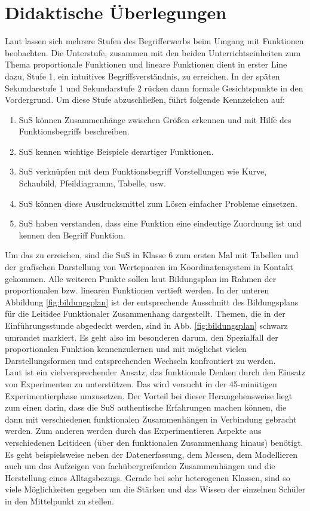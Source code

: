 \documentclass[../main.tex]{subfiles}
\begin{document}
\section{Didaktische Überlegungen}
Laut \cite{Vollrath2007} lassen sich mehrere Stufen des Begrifferwerbs beim Umgang mit Funktionen beobachten. Die Unterstufe, zusammen mit den beiden Unterrichtseinheiten zum Thema proportionale Funktionen und lineare Funktionen dient in erster Line dazu, Stufe 1, ein intuitives Begriffsverständnis, zu erreichen. In der späten Sekundarstufe 1 und Sekundarstufe 2 rücken dann formale Gesichtspunkte in den Vordergrund. Um diese Stufe abzuschließen, führt \cite{Beckmann2009} folgende Kennzeichen auf:
\begin{enumerate}
    \item SuS können Zusammenhänge zwischen Größen erkennen und mit Hilfe des Funktionsbegriffs beschreiben.
    \item SuS kennen wichtige Beispiele derartiger Funktionen.
    \item SuS verknüpfen mit dem Funktionsbegriff Vorstellungen wie Kurve, Schaubild, Pfeildiagramm, Tabelle, usw.
    \item SuS können diese Ausdrucksmittel zum Lösen einfacher Probleme einsetzen.
    \item SuS haben verstanden, dass eine Funktion eine eindeutige Zuordnung ist und kennen den Begriff \glqq Funktion\grqq{}.
\end{enumerate}
Um das zu erreichen, sind die SuS in Klasse 6 zum ersten Mal mit Tabellen und der grafischen Darstellung von Wertepaaren im Koordinatensystem in Kontakt gekommen. Alle weiteren Punkte sollen laut Bildungsplan \cite{Kultus2016} im Rahmen der proportionalen bzw. linearen Funktionen vertieft werden. In der unteren Abbildung \ref{fig:bildungsplan} ist der entsprechende Ausschnitt des Bildungsplans für die Leitidee \glqq Funktionaler Zusammenhang\grqq{} dargestellt. Themen, die in der Einführungsstunde abgedeckt werden, sind in Abb. \ref{fig:bildungsplan} schwarz umrandet markiert. Es geht also im besonderen darum, den Spezialfall der proportionalen Funktion kennenzulernen und mit möglichst vielen Darstellungsformen und entsprechenden Wechseln konfrontiert zu werden. \\
Laut \cite{Beckmann2009} ist ein vielversprechender Ansatz, das funktionale Denken durch den Einsatz von Experimenten zu unterstützen. Das wird versucht in der 45-minütigen Experimentierphase umzusetzen. Der Vorteil bei dieser Herangehensweise liegt zum einen darin, dass die SuS authentische Erfahrungen machen können, die dann mit verschiedenen funktionalen Zusammenhängen in Verbindung gebracht werden. Zum anderen werden durch das Experimentieren Aspekte aus verschiedenen Leitideen (über den funktionalen Zusammenhang hinaus) benötigt. Es geht beispielsweise neben der Datenerfassung, dem Messen, dem Modellieren auch um das Aufzeigen von fachübergreifenden Zusammenhängen und die Herstellung eines Alltagsbezugs. Gerade bei sehr heterogenen Klassen, sind so viele Möglichkeiten gegeben um die Stärken und das Wissen der einzelnen Schüler in den Mittelpunkt zu stellen.\\
\end{document}
